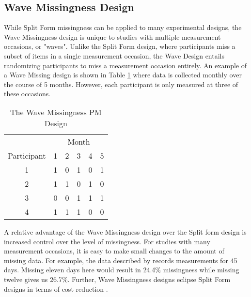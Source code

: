 \documentclass{svjour3}                     %
\begin{document}
\subsection{Wave Missingness Design}
\label{sec:1.2}
While Split Form missingness can be applied to many experimental designs, the Wave Missingness design \citep{little2013planned} is unique to studies with multiple measurement occasions, or "waves". Unlike the Split Form design, where participants miss a subset of items in a single measurement occasion, the Wave Design entails randomizing participants to miss a measurement occasion entirely. An example of a Wave Missing design is shown in Table \ref{tab:table11} where data is collected monthly over the course of 5 months. However, each participant is only measured at three of these occasions. \par

\begin{table}[b!]
	\centering
	\caption{The Wave Missingness PM Design}
	\label{tab:table11}
	\setlength{\tabcolsep}{0.75cm}
	\begin{tabular}{c|ccccc}
		\toprule
		& \multicolumn{5}{c}{Month} \\
		Participant & 1 & 2 & 3 & 4 & 5 \\
		\midrule
		1 & 1 & 0 & 1 & 0 & 1 \\
		2 & 1 & 1 & 0 & 1 & 0 \\
		3 & 0 & 0 & 1 & 1 & 1 \\
		4 & 1 & 1 & 1 & 0 & 0 \\
		\bottomrule
	\end{tabular}
\end{table}

A relative advantage of the Wave Missingness design over the Split form design is increased control over the level of missingness. For studies with many measurement occasions, it is easy to make small changes to the amount of missing data. For example, the data described by \citet{pellowski2016alcohol} records measurements for 45 days. Missing eleven days here would result in 24.4\% missingness while missing twelve gives us 26.7\%. Further, Wave Missingness designs eclipse Split Form designs in terms of cost reduction \citep{little2013planned}. \par
\end{document}
